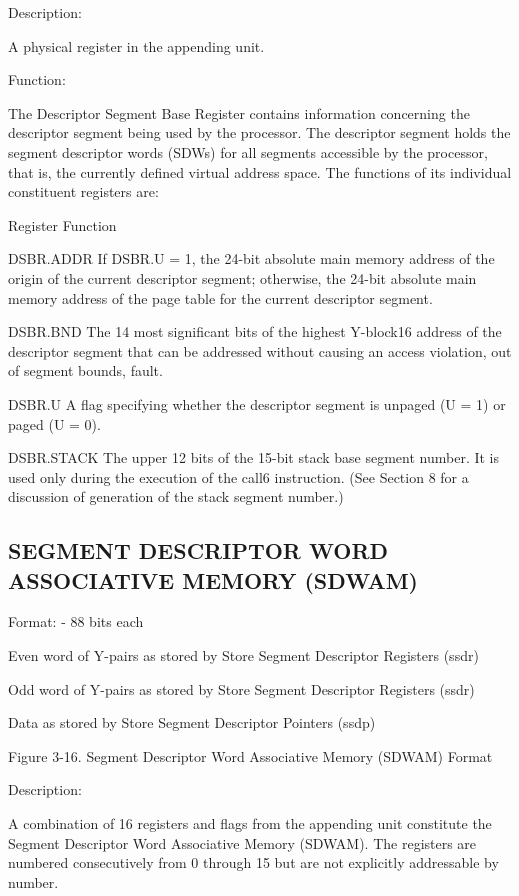 Description:

A physical register in the appending unit.

Function:

The Descriptor Segment Base Register contains information concerning the
descriptor segment being used by the processor.  The descriptor segment holds
the segment descriptor words (SDWs) for all segments accessible by the
processor, that is, the currently defined virtual address space. The functions
of its individual constituent registers are:

Register Function

DSBR.ADDR If DSBR.U = 1, the 24-bit absolute main memory address of the origin
of the current descriptor segment; otherwise, the 24-bit absolute main memory
address of the page table for the current descriptor segment.

DSBR.BND The 14 most significant bits of the highest Y-block16 address of the
descriptor segment that can be addressed without causing an access violation,
out of segment bounds, fault.

DSBR.U A flag specifying whether the descriptor segment is unpaged (U = 1) or
paged (U = 0).

DSBR.STACK The upper 12 bits of the 15-bit stack base segment number. It is
used only during the execution of the call6 instruction. (See Section 8 for a
discussion of generation of the stack segment number.)

\subsection{SEGMENT DESCRIPTOR WORD ASSOCIATIVE MEMORY (SDWAM)}

Format: - 88 bits each

Even word of Y-pairs as stored by Store Segment Descriptor Registers (ssdr)

Odd word of Y-pairs as stored by Store Segment Descriptor Registers (ssdr)

Data as stored by Store Segment Descriptor Pointers (ssdp)

Figure 3-16. Segment Descriptor Word Associative Memory (SDWAM) Format

Description:

A combination of 16 registers and flags from the appending unit constitute the
Segment Descriptor Word Associative Memory (SDWAM). The registers are numbered
consecutively from 0 through 15 but are not explicitly addressable by number.

